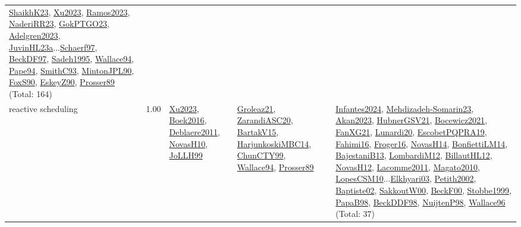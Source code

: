 {\begin{longtable}{p{3cm}r>{\raggedright\arraybackslash}p{6cm}>{\raggedright\arraybackslash}p{6cm}>{\raggedright\arraybackslash}p{8cm}}
\hyperref[detail:ShaikhK23]{ShaikhK23}, \hyperref[detail:Xu2023]{Xu2023}, \hyperref[detail:Ramos2023]{Ramos2023}, \hyperref[detail:NaderiRR23]{NaderiRR23}, \hyperref[detail:GokPTGO23]{GokPTGO23}, \hyperref[detail:Adelgren2023]{Adelgren2023}, \hyperref[detail:JuvinHL23a]{JuvinHL23a}...\hyperref[detail:Schaerf97]{Schaerf97}, \hyperref[detail:BeckDF97]{BeckDF97}, \hyperref[detail:Sadeh1995]{Sadeh1995}, \hyperref[detail:Wallace94]{Wallace94}, \hyperref[detail:Pape94]{Pape94}, \hyperref[detail:SmithC93]{SmithC93}, \hyperref[detail:MintonJPL90]{MintonJPL90}, \hyperref[detail:FoxS90]{FoxS90}, \hyperref[detail:EskeyZ90]{EskeyZ90}, \hyperref[detail:Prosser89]{Prosser89} (Total: 164)\\
\index{reactive scheduling}\index{Concepts!reactive scheduling}reactive scheduling &  1.00 & \hyperref[detail:Xu2023]{Xu2023}, \hyperref[detail:Boek2016]{Boek2016}, \hyperref[detail:Deblaere2011]{Deblaere2011}, \hyperref[detail:NovasH10]{NovasH10}, \hyperref[detail:JoLLH99]{JoLLH99} & \hyperref[detail:Groleaz21]{Groleaz21}, \hyperref[detail:ZarandiASC20]{ZarandiASC20}, \hyperref[detail:BartakV15]{BartakV15}, \hyperref[detail:HarjunkoskiMBC14]{HarjunkoskiMBC14}, \hyperref[detail:ChunCTY99]{ChunCTY99}, \hyperref[detail:Wallace94]{Wallace94}, \hyperref[detail:Prosser89]{Prosser89} & \hyperref[detail:Infantes2024]{Infantes2024}, \hyperref[detail:Mehdizadeh-Somarin23]{Mehdizadeh-Somarin23}, \hyperref[detail:Akan2023]{Akan2023}, \hyperref[detail:HubnerGSV21]{HubnerGSV21}, \hyperref[detail:Bocewicz2021]{Bocewicz2021}, \hyperref[detail:FanXG21]{FanXG21}, \hyperref[detail:Lunardi20]{Lunardi20}, \hyperref[detail:EscobetPQPRA19]{EscobetPQPRA19}, \hyperref[detail:Fahimi16]{Fahimi16}, \hyperref[detail:Froger16]{Froger16}, \hyperref[detail:NovasH14]{NovasH14}, \hyperref[detail:BonfiettiLM14]{BonfiettiLM14}, \hyperref[detail:BajestaniB13]{BajestaniB13}, \hyperref[detail:LombardiM12]{LombardiM12}, \hyperref[detail:BillautHL12]{BillautHL12}, \hyperref[detail:NovasH12]{NovasH12}, \hyperref[detail:Lacomme2011]{Lacomme2011}, \hyperref[detail:Magato2010]{Magato2010}, \hyperref[detail:LopesCSM10]{LopesCSM10}...\hyperref[detail:Elkhyari03]{Elkhyari03}, \hyperref[detail:Petith2002]{Petith2002}, \hyperref[detail:Baptiste02]{Baptiste02}, \hyperref[detail:SakkoutW00]{SakkoutW00}, \hyperref[detail:BeckF00]{BeckF00}, \hyperref[detail:Stobbe1999]{Stobbe1999}, \hyperref[detail:PapaB98]{PapaB98}, \hyperref[detail:BeckDDF98]{BeckDDF98}, \hyperref[detail:NuijtenP98]{NuijtenP98}, \hyperref[detail:Wallace96]{Wallace96} (Total: 37)\\

\end{longtable}}
